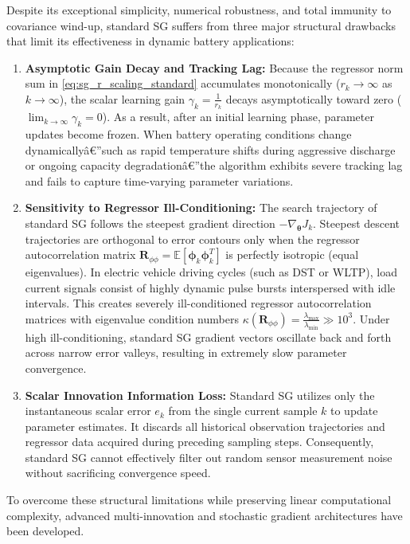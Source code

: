 Despite its exceptional simplicity, numerical robustness, and total immunity to covariance wind-up, standard SG suffers from three major structural drawbacks that limit its effectiveness in dynamic battery applications:
\begin{enumerate}
    \item \textbf{Asymptotic Gain Decay and Tracking Lag:} Because the regressor norm sum in \eqref{eq:sg_r_scaling_standard} accumulates monotonically ($r_k \to \infty$ as $k \to \infty$), the scalar learning gain $\gamma_k = \frac{1}{r_k}$ decays asymptotically toward zero ($\lim_{k \to \infty} \gamma_k = 0$). As a result, after an initial learning phase, parameter updates become frozen. When battery operating conditions change dynamicallyâ€”such as rapid temperature shifts during aggressive discharge or ongoing capacity degradationâ€”the algorithm exhibits severe tracking lag and fails to capture time-varying parameter variations.
    \item \textbf{Sensitivity to Regressor Ill-Conditioning:} The search trajectory of standard SG follows the steepest gradient direction $-\nabla_{\boldsymbol{\theta}} J_k$. Steepest descent trajectories are orthogonal to error contours only when the regressor autocorrelation matrix $\mathbf{R}_{\phi \phi} = \mathbb{E}[\boldsymbol{\phi}_k \boldsymbol{\phi}_k^T]$ is perfectly isotropic (equal eigenvalues). In electric vehicle driving cycles (such as DST or WLTP), load current signals consist of highly dynamic pulse bursts interspersed with idle intervals. This creates severely ill-conditioned regressor autocorrelation matrices with eigenvalue condition numbers $\kappa(\mathbf{R}_{\phi \phi}) = \frac{\lambda_{\max}}{\lambda_{\min}} \gg 10^3$. Under high ill-conditioning, standard SG gradient vectors oscillate back and forth across narrow error valleys, resulting in extremely slow parameter convergence.
    \item \textbf{Scalar Innovation Information Loss:} Standard SG utilizes only the instantaneous scalar error $e_k$ from the single current sample $k$ to update parameter estimates. It discards all historical observation trajectories and regressor data acquired during preceding sampling steps. Consequently, standard SG cannot effectively filter out random sensor measurement noise without sacrificing convergence speed.
\end{enumerate}

To overcome these structural limitations while preserving linear computational complexity, advanced multi-innovation and stochastic gradient architectures have been developed.


